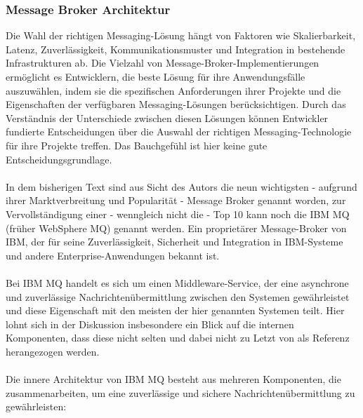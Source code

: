 \documentclass[../vs-script-first-v01.tex]{subfiles}
\begin{document}
\subsubsection{Message Broker Architektur}

Die Wahl der richtigen Messaging-Lösung hängt von Faktoren wie Skalierbarkeit, Latenz, Zuverlässigkeit, Kommunikationsmuster und Integration in bestehende Infrastrukturen ab. Die Vielzahl von Message-Broker-Implementierungen ermöglicht es Entwicklern, die beste Lösung für ihre Anwendungsfälle auszuwählen, indem sie die spezifischen Anforderungen ihrer Projekte und die Eigenschaften der verfügbaren Messaging-Lösungen berücksichtigen. Durch das Verständnis der Unterschiede zwischen diesen Lösungen können Entwickler fundierte Entscheidungen über die Auswahl der richtigen Messaging-Technologie für ihre Projekte treffen. Das Bauchgefühl ist hier keine gute Entscheidungsgrundlage. 
\\\\
In dem bisherigen Text sind aus Sicht des Autors die neun wichtigsten - aufgrund ihrer Marktverbreitung und Popularität - Message Broker genannt worden, zur Vervollständigung einer - wenngleich nicht die - Top 10 kann noch die IBM MQ (früher WebSphere MQ) genannt werden. Ein proprietärer Message-Broker von IBM, der für seine Zuverlässigkeit, Sicherheit und Integration in IBM-Systeme und andere Enterprise-Anwendungen bekannt ist.
\\\\
Bei IBM MQ handelt es sich um einen Middleware-Service, der eine asynchrone und zuverlässige Nachrichtenübermittlung zwischen den Systemen gewährleistet und diese Eigenschaft mit den meisten der hier genannten Systemen teilt. Hier lohnt sich in der Diskussion insbesondere ein Blick auf die internen Komponenten, dass diese nicht selten und dabei nicht zu Letzt von \cite{tanenbaum2017distributed} als Referenz herangezogen werden.
\\\\
Die innere Architektur von IBM MQ besteht aus mehreren Komponenten, die zusammenarbeiten, um eine zuverlässige und sichere Nachrichtenübermittlung zu gewährleisten:
\end{document}
